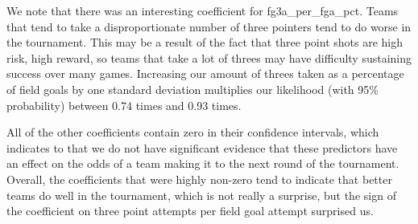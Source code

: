 \documentclass[10pt,a4paper, hidelinks]{article} %
\begin{document}
We note that there was an interesting coefficient for fg3a\_per\_fga\_pct. Teams that tend to take a disproportionate number of three pointers tend to do worse in the tournament. This may be a result of the fact that three point shots are high risk, high reward, so teams that take a lot of threes may have difficulty sustaining success over many games. Increasing our amount of threes taken as a percentage of field goals by one standard deviation multiplies our likelihood (with 95\% probability) between 0.74 times and 0.93 times.

All of the other coefficients contain zero in their confidence intervals, which indicates to that we do not have significant evidence that these predictors have an effect on the odds of a team making it to the next round of the tournament. Overall, the coefficients that were highly non-zero tend to indicate that better teams do well in the tournament, which is not really a surprise, but the sign of the coefficient on three point attempts per field goal attempt surprised us. 
\end{document}
